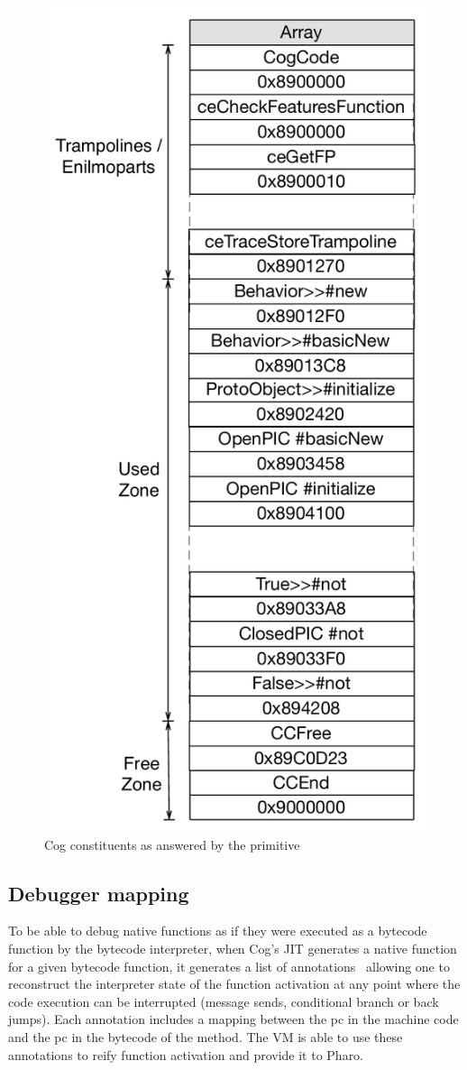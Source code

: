 \documentclass[10pt,preprint,nonatbib]{sigplanconf}
\newcommand{\figlabel}[1]{\label{fig:#1}}
\begin{document}
 \begin{figure}[b!]
     \begin{center}
         \includegraphics[width=0.66\linewidth]{ContentsOfCollectCogCodePrim}
         \caption{Cog constituents as answered by the primitive}
         \figlabel{fig:ContentsOfCollectCogCodePrim}
     \end{center}
 \end{figure}
 
\subsection{Debugger mapping}

To be able to debug native functions as if they were executed as a bytecode function by the bytecode interpreter, when Cog's JIT generates a native function for a given bytecode function, it generates a list of annotations~\cite{Ber16d} allowing one to reconstruct the interpreter state of the function activation at any point where the code execution can be interrupted (message sends, conditional branch or back jumps). Each annotation includes a mapping between the pc in the machine code and the pc in the bytecode of the method. The VM is able to use these annotations to reify function activation and provide it to Pharo.
 
\end{document}
